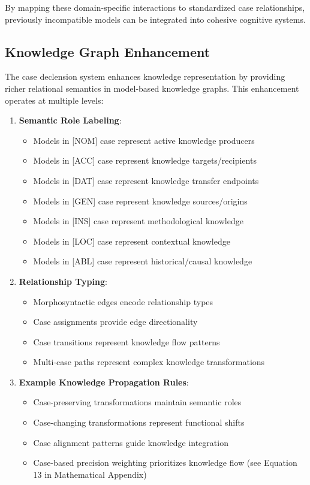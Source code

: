 By mapping these domain-specific interactions to standardized case
relationships, previously incompatible models can be integrated into
cohesive cognitive systems.

\hypertarget{knowledge-graph-enhancement}{%
\subsection{Knowledge Graph
Enhancement}\label{knowledge-graph-enhancement}}

The case declension system enhances knowledge representation by
providing richer relational semantics in model-based knowledge graphs.
This enhancement operates at multiple levels:

\begin{enumerate}
\def\labelenumi{\arabic{enumi}.}
\tightlist
\item
  \textbf{Semantic Role Labeling}:

  \begin{itemize}
  \tightlist
  \item
    Models in {[}NOM{]} case represent active knowledge producers
  \item
    Models in {[}ACC{]} case represent knowledge targets/recipients
  \item
    Models in {[}DAT{]} case represent knowledge transfer endpoints
  \item
    Models in {[}GEN{]} case represent knowledge sources/origins
  \item
    Models in {[}INS{]} case represent methodological knowledge
  \item
    Models in {[}LOC{]} case represent contextual knowledge
  \item
    Models in {[}ABL{]} case represent historical/causal knowledge
  \end{itemize}
\item
  \textbf{Relationship Typing}:

  \begin{itemize}
  \tightlist
  \item
    Morphosyntactic edges encode relationship types
  \item
    Case assignments provide edge directionality
  \item
    Case transitions represent knowledge flow patterns
  \item
    Multi-case paths represent complex knowledge transformations
  \end{itemize}
\item
  \textbf{Example Knowledge Propagation Rules}:

  \begin{itemize}
  \tightlist
  \item
    Case-preserving transformations maintain semantic roles
  \item
    Case-changing transformations represent functional shifts
  \item
    Case alignment patterns guide knowledge integration
  \item
    Case-based precision weighting prioritizes knowledge flow (see
    Equation 13 in Mathematical Appendix)
  \end{itemize}
\end{enumerate}

